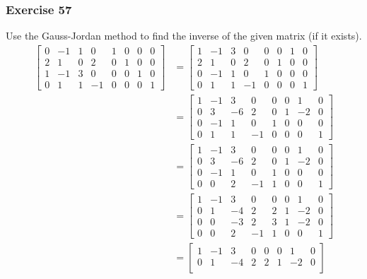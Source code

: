 \documentclass[letterpaper, 12pt]{math}
\begin{document}
\subsubsection*{Exercise 57}
Use the Gauss-Jordan method to find the inverse of the given matrix (if it
exists).
\begin{align*}
  \begin{bmatrix}
    0 & -1 & 1 & 0 & 1 & 0 & 0 & 0 \\
    2 & 1 & 0 & 2 & 0 & 1 & 0 & 0 \\
    1 & -1 & 3 & 0 & 0 & 0 & 1 & 0 \\
    0 & 1 & 1 & -1 & 0 & 0 & 0 & 1
  \end{bmatrix} &= \begin{bmatrix}
    1 & -1 & 3 &  0 & 0 & 0 & 1 & 0 \\
    2 &  1 & 0 &  2 & 0 & 1 & 0 & 0 \\
    0 & -1 & 1 &  0 & 1 & 0 & 0 & 0 \\
    0 &  1 & 1 & -1 & 0 & 0 & 0 & 1
  \end{bmatrix} \\
  &= \begin{bmatrix}
    1 & -1 & 3 & 0 & 0 & 0 & 1 & 0 \\
    0 & 3 & -6 & 2 & 0 & 1 & -2 & 0 \\
    0 & -1 & 1 & 0 & 1 & 0 & 0 & 0 \\
    0 & 1 & 1 & -1 & 0 & 0 & 0 & 1
  \end{bmatrix} \\
  &= \begin{bmatrix}
    1 & -1 & 3 & 0 & 0 & 0 & 1 & 0 \\
    0 & 3 & -6 & 2 & 0 & 1 & -2 & 0 \\
    0 & -1 & 1 & 0 & 1 & 0 & 0 & 0 \\
    0 & 0 & 2 & -1 & 1 & 0 & 0 & 1
  \end{bmatrix} \\
  &= \begin{bmatrix}
    1 & -1 & 3 & 0 & 0 & 0 & 1 & 0 \\
    0 & 1 & -4 & 2 & 2 & 1 & -2 & 0 \\
    0 & 0 & -3 & 2 & 3 & 1 & -2 & 0 \\
    0 & 0 & 2 & -1 & 1 & 0 & 0 & 1
  \end{bmatrix} \\
  &= \begin{bmatrix}
    1 & -1 & 3 & 0 & 0 & 0 & 1 & 0 \\
    0 & 1 & -4 & 2 & 2 & 1 & -2 & 0 \\

\end{bmatrix}
\end{align*}
\end{document}
